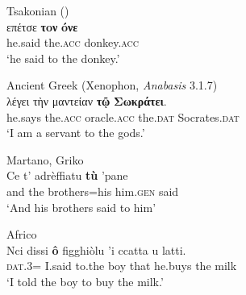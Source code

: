 \documentclass[output=paper,modfonts,nonflat]{langsci/langscibook}
\begin{document}
  \ea  Tsakonian (\citealt{Manolessou2004})\\
\gll      επ\'{ε}τσε  \textbf{τoν} \textbf{óνε} \\
      he.said  the.\textsc{acc}  donkey.\textsc{acc} \\
      \glt `he said to the donkey.'
      
\ex Ancient Greek (Xenophon, \textit{Anabasis} 3.1.7)  \\
\gll  λ\'{ε}γει τὴν μαντείαν \textbf{τῷ} \textbf{Σωκράτει}.\\
      he.says  the.\textsc{acc}  oracle.\textsc{acc}  the.\textsc{dat}  Socrates.\textsc{dat}\\
      \glt `I am a servant to the gods.'

\ex Martano, Griko\\
      \gll Ce  t’  adrèffiatu  \textbf{tù} ’pane\\
      and  the  brothers=his  him.\textsc{gen}  said\\
      \glt `And his brothers said to him'

\ex Africo\\
      \gll Nci  dissi  \textbf{ô} figghiòlu  ’i  ccatta  u  latti.\\
      \textsc{dat}.3=  I.said  to.the  boy  that  he.buys  the  milk\\
      \glt `I told the boy to buy the milk.'
      \z
      \z
\end{document}
